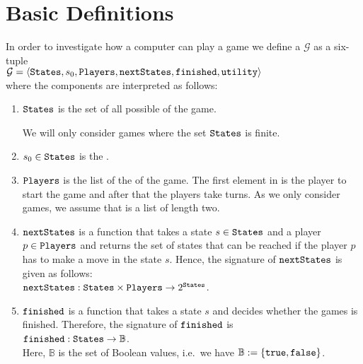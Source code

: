 \section{Basic Definitions}
In order to investigate how a computer can play a game we define a  $\mathcal{G}$ as a six-tuple 
\\[0.2cm]
\hspace*{1.3cm}
$\mathcal{G} = \langle \texttt{States}, s_0, \texttt{Players}, \texttt{nextStates}, \texttt{finished},\texttt{utility} \rangle$
\\[0.2cm]
where the components are interpreted as follows:
\begin{enumerate}
\item $\texttt{States}$ is the set of all possible  of the game.

      We will only consider games where the set $\texttt{States}$ is finite.
\item $s_0 \in \texttt{States}$ is the .
\item $\texttt{Players}$ is  the list of the  of the game.  The first element in  is
      the player to start the game and after that the players take turns.  As we only consider 
      games, we assume that  is a list of length two.  
\item $\texttt{nextStates}$ is a function that takes a state $s \in \texttt{States}$ and a player $p \in \texttt{Players}$ and returns the set of
      states that can be reached if the player $p$ has to make a move in the state $s$.  Hence, the signature of
      $\texttt{nextStates}$ is given as follows:
      \\[0.2cm]
      \hspace*{1.3cm}
      $\texttt{nextStates}: \texttt{States} \times \texttt{Players} \rightarrow 2^{\texttt{States}}$.
\item $\texttt{finished}$ is a function that takes a state $s$ and decides whether the games is finished.
      Therefore, the signature of $\texttt{finished}$ is
      \\[0.2cm]
      \hspace*{1.3cm}
      $\texttt{finished}: \texttt{States} \rightarrow \mathbb{B}$.
      \\[0.2cm]
      Here, $\mathbb{B}$ is the set of Boolean values, i.e.~we have $\mathbb{B} := \{ \texttt{true}, \texttt{false} \}$.
  

\end{enumerate}
